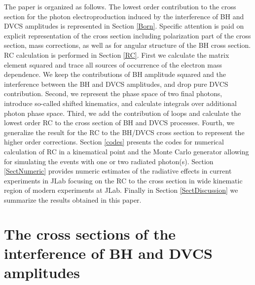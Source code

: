 \documentclass[aps,prd,reprint,groupedaddress,preprintnumbers,showpacs]{revtex4-1}
\begin{document}
The paper is organized as follows.  The lowest order contribution to the cross section for the photon
electroproduction induced by the interference of BH and DVCS amplitudes
is represented in Section \ref{Born}. Specific attention is paid on explicit representation of the  cross section including polarization part of the cross section, 
mass corrections, as well as for angular structure of the BH cross section. RC calculation is performed in Section \ref{RC}. First we calculate the matrix element squared and trace all sources of occurrence of the electron mass dependence. We keep the contributions of BH amplitude squared and the interference between the BH and DVCS amplitudes, and drop pure DVCS contribution. Second, we represent the phase space of two final photons, introduce so-called shifted kinematics, and calculate integrals over additional photon phase space. Third, we add the contribution of loops and calculate the lowest order RC to the cross section of BH and DVCS processes. Fourth, we generalize the result for the RC to the BH/DVCS cross section to represent the higher order  corrections.  
Section \ref{codes} presents the codes for numerical calculation of RC in a kinematical point and the Monte Carlo generator allowing for simulating the events with one or two radiated photon(s). Section \ref{SectNumeric} provides  numeric estimates of the radiative effects in current experiments in JLab focusing on the RC 
to the cross section in wide kinematic region of modern experiments at JLab.  Finally in Section \ref{SectDiscussion} we summarize the results obtained in this paper.





\section{\label{Born}The cross sections of the interference of BH and DVCS amplitudes}
\end{document}
